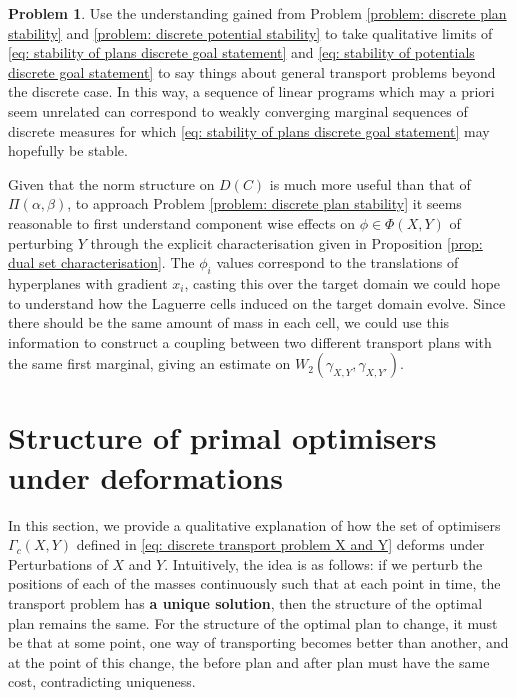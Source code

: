 \documentclass[11pt, oneside, titlepage]{book}
\theoremstyle{plain}
\theoremstyle{definition}
\newtheorem{problem}{Problem}
\begin{document}
\begin{problem}
    Use the understanding gained from Problem \ref{problem: discrete plan stability} and \ref{problem: discrete potential stability} to take qualitative limits of \eqref{eq: stability of plans discrete goal statement} and \eqref{eq: stability of potentials discrete goal statement} to say things about general transport problems beyond the discrete case. In this way, a sequence of linear programs which may a priori seem unrelated can correspond to weakly converging marginal sequences of discrete measures for which \eqref{eq: stability of plans discrete goal statement} may hopefully be stable.
\end{problem}

Given that the norm structure on $D(C)$ is much more useful than that of $\Pi(\alpha, \beta)$, to approach Problem \ref{problem: discrete plan stability} it seems reasonable to first understand component wise effects on $\phi \in \Phi(X, Y)$ of perturbing $Y$ through the explicit characterisation given in Proposition \ref{prop: dual set characterisation}. The $\phi_i$ values correspond to the translations of hyperplanes with gradient $x_i$, casting this over the target domain we could hope to understand how the Laguerre cells induced on the target domain evolve. Since there should be the same amount of mass in each cell, we could use this information to construct a coupling between two different transport plans with the same first marginal, giving an estimate on $W_2(\gamma_{X, Y}, \gamma_{X, Y'})$.



















\section{Structure of primal optimisers under deformations}


In this section, we provide a qualitative explanation of how the set of optimisers $\Gamma_c(X, Y)$ defined in \eqref{eq: discrete transport problem X and Y} deforms under Perturbations of $X$ and $Y$. Intuitively, the idea is as follows: if we perturb the positions of each of the masses continuously such that at each point in time, the transport problem has \textbf{a unique solution}, then the structure of the optimal plan remains the same. For the structure of the optimal plan to change, it must be that at some point, one way of transporting becomes better than another, and at the point of this change, the before plan and after plan must have the same cost, contradicting uniqueness.
\end{document}
